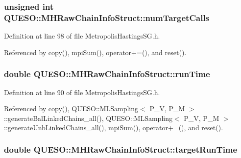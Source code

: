 \hypertarget{struct_q_u_e_s_o_1_1_m_h_raw_chain_info_struct_a506e08bdffc1f777e33c7ec2d7862747}{
\subsubsection[{num\-Target\-Calls}]{\setlength{\rightskip}{0pt plus 5cm}unsigned int Q\-U\-E\-S\-O\-::\-M\-H\-Raw\-Chain\-Info\-Struct\-::num\-Target\-Calls}}\label{struct_q_u_e_s_o_1_1_m_h_raw_chain_info_struct_a506e08bdffc1f777e33c7ec2d7862747}


Definition at line 98 of file Metropolis\-Hastings\-S\-G.\-h.



Referenced by copy(), mpi\-Sum(), operator+=(), and reset().

\hypertarget{struct_q_u_e_s_o_1_1_m_h_raw_chain_info_struct_a5b36b9734f0b40d54cfd4c58c18c9b45}{
\subsubsection[{run\-Time}]{\setlength{\rightskip}{0pt plus 5cm}double Q\-U\-E\-S\-O\-::\-M\-H\-Raw\-Chain\-Info\-Struct\-::run\-Time}}\label{struct_q_u_e_s_o_1_1_m_h_raw_chain_info_struct_a5b36b9734f0b40d54cfd4c58c18c9b45}


Definition at line 90 of file Metropolis\-Hastings\-S\-G.\-h.



Referenced by copy(), Q\-U\-E\-S\-O\-::\-M\-L\-Sampling$<$ P\-\_\-\-V, P\-\_\-\-M $>$\-::generate\-Bal\-Linked\-Chains\-\_\-all(), Q\-U\-E\-S\-O\-::\-M\-L\-Sampling$<$ P\-\_\-\-V, P\-\_\-\-M $>$\-::generate\-Unb\-Linked\-Chains\-\_\-all(), mpi\-Sum(), operator+=(), and reset().

\hypertarget{struct_q_u_e_s_o_1_1_m_h_raw_chain_info_struct_ab230db8f99e46f0c1e4fc6c2aa3773eb}{
\subsubsection[{target\-Run\-Time}]{\setlength{\rightskip}{0pt plus 5cm}double Q\-U\-E\-S\-O\-::\-M\-H\-Raw\-Chain\-Info\-Struct\-::target\-Run\-Time}}\label{struct_q_u_e_s_o_1_1_m_h_raw_chain_info_struct_ab230db8f99e46f0c1e4fc6c2aa3773eb}


